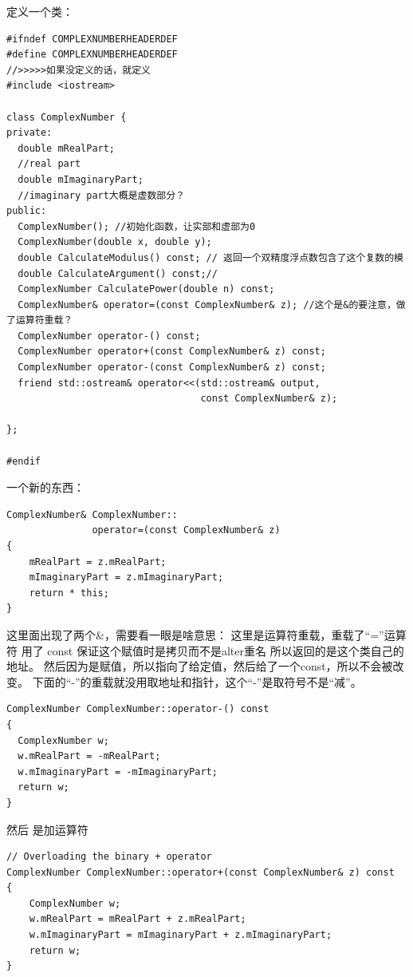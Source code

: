 \documentclass[
]{book}
\theoremstyle{definition}
\theoremstyle{definition}
\theoremstyle{definition}
\theoremstyle{remark}
\begin{document}
定义一个类：

\begin{verbatim}
#ifndef COMPLEXNUMBERHEADERDEF 
#define COMPLEXNUMBERHEADERDEF
//>>>>>如果没定义的话，就定义
#include <iostream>

class ComplexNumber { 
private:
  double mRealPart; 
  //real part
  double mImaginaryPart; 
  //imaginary part大概是虚数部分？
public:
  ComplexNumber(); //初始化函数，让实部和虚部为0
  ComplexNumber(double x, double y); 
  double CalculateModulus() const; // 返回一个双精度浮点数包含了这个复数的模
  double CalculateArgument() const;// 
  ComplexNumber CalculatePower(double n) const; 
  ComplexNumber& operator=(const ComplexNumber& z); //这个是&的要注意，做了运算符重载？
  ComplexNumber operator-() const; 
  ComplexNumber operator+(const ComplexNumber& z) const; 
  ComplexNumber operator-(const ComplexNumber& z) const; 
  friend std::ostream& operator<<(std::ostream& output, 
                                  const ComplexNumber& z);

}; 

#endif
\end{verbatim}

一个新的东西：

\begin{verbatim}
ComplexNumber& ComplexNumber::
               operator=(const ComplexNumber& z)
{
    mRealPart = z.mRealPart; 
    mImaginaryPart = z.mImaginaryPart; 
    return * this;
}
\end{verbatim}

这里面出现了两个\&，需要看一眼是啥意思：
这里是运算符重载，重载了``=''运算符
用了 const 保证这个赋值时是拷贝而不是alter重名
所以返回的是这个类自己的地址。
然后因为是赋值，所以指向了给定值，然后给了一个const，所以不会被改变。
下面的``-''的重载就没用取地址和指针，这个``-''是取符号不是``减''。

\begin{verbatim}
ComplexNumber ComplexNumber::operator-() const 
{
  ComplexNumber w;
  w.mRealPart = -mRealPart;
  w.mImaginaryPart = -mImaginaryPart;
  return w; 
}
\end{verbatim}

然后
是加运算符

\begin{verbatim}
// Overloading the binary + operator 
ComplexNumber ComplexNumber::operator+(const ComplexNumber& z) const 
{
    ComplexNumber w;
    w.mRealPart = mRealPart + z.mRealPart;
    w.mImaginaryPart = mImaginaryPart + z.mImaginaryPart;
    return w; 
}
\end{verbatim}
\end{document}
